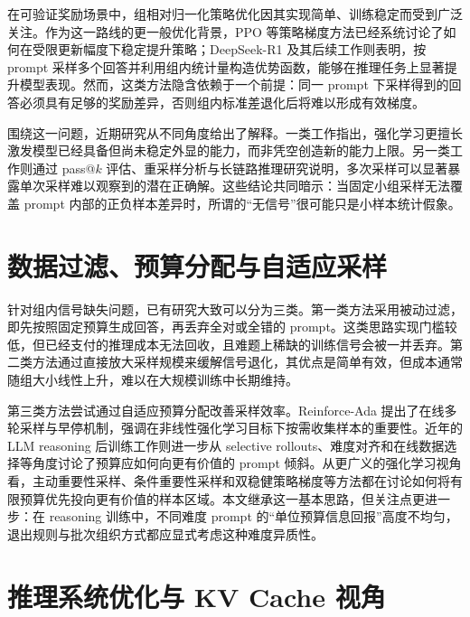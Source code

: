 在可验证奖励场景中，组相对归一化策略优化因其实现简单、训练稳定而受到广泛关注。作为这一路线的更一般优化背景，PPO 等策略梯度方法已经系统讨论了如何在受限更新幅度下稳定提升策略\citep{schulman2017proximal}；DeepSeek-R1 及其后续工作则表明，按 prompt 采样多个回答并利用组内统计量构造优势函数，能够在推理任务上显著提升模型表现\citep{deepseekai2025deepseekr1,zhang2025realsafer1}。然而，这类方法隐含依赖于一个前提：同一 prompt 下采样得到的回答必须具有足够的奖励差异，否则组内标准差退化后将难以形成有效梯度。

围绕这一问题，近期研究从不同角度给出了解释。一类工作指出，强化学习更擅长激发模型已经具备但尚未稳定外显的能力，而非凭空创造新的能力上限\citep{kim2025reinforcement,yue2025does}。另一类工作则通过 pass@$k$ 评估、重采样分析与长链路推理研究说明，多次采样可以显著暴露单次采样难以观察到的潜在正确解\citep{chen2021codex,wang2022selfconsistency,lewkowycz2022solving}。这些结论共同暗示：当固定小组采样无法覆盖 prompt 内部的正负样本差异时，所谓的“无信号”很可能只是小样本统计假象。

\section{数据过滤、预算分配与自适应采样}

针对组内信号缺失问题，已有研究大致可以分为三类。第一类方法采用被动过滤，即先按照固定预算生成回答，再丢弃全对或全错的 prompt。这类思路实现门槛较低，但已经支付的推理成本无法回收，且难题上稀缺的训练信号会被一并丢弃。第二类方法通过直接放大采样规模来缓解信号退化，其优点是简单有效，但成本通常随组大小线性上升，难以在大规模训练中长期维持\citep{deepseekai2025deepseekr1,yu2025dapo}。

第三类方法尝试通过自适应预算分配改善采样效率。Reinforce-Ada 提出了在线多轮采样与早停机制，强调在非线性强化学习目标下按需收集样本的重要性\citep{xiong2025reinforceada}。近年的 LLM reasoning 后训练工作则进一步从 selective rollouts、难度对齐和在线数据选择等角度讨论了预算应如何向更有价值的 prompt 倾斜\citep{zheng2025act,kong2025rethinking,sun2025improvingdata,qu2025promptdifficulty}。从更广义的强化学习视角看，主动重要性采样、条件重要性采样和双稳健策略梯度等方法都在讨论如何将有限预算优先投向更有价值的样本区域\citep{papini2024policy,humayoo2018relative,rowland2019conditional,huang2019importance}。本文继承这一基本思路，但关注点更进一步：在 reasoning 训练中，不同难度 prompt 的“单位预算信息回报”高度不均匀，退出规则与批次组织方式都应显式考虑这种难度异质性。

\section{推理系统优化与 KV Cache 视角}

